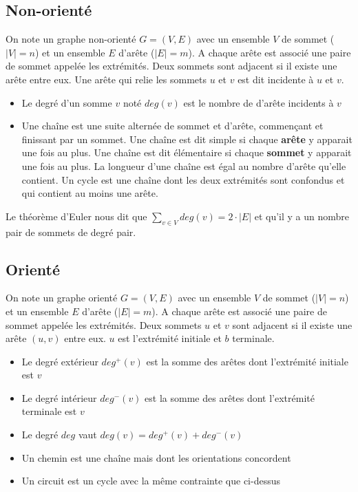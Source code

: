 \documentclass[11pt,a4paper]{report}
\begin{document}
\subsection{Non-orienté}
On note un graphe non-orienté $G=(V,E)$ avec un ensemble $V$ de sommet ($|V|=n$) et un ensemble $E$ d'arête ($|E|=m$). A chaque arête est associé une paire de sommet appelée les extrémités. Deux sommets sont adjacent si il existe une arête entre eux. Une arête qui relie les sommets $u$ et $v$ est dit incidente à $u$ et $v$.

\begin{itemize}
    \item Le degré d'un somme $v$ noté $deg(v)$ est le nombre de d'arête incidents à $v$
    \item Une chaîne est une suite alternée de sommet et d'arête, commençant et finissant par un sommet. Une chaîne est dit simple si chaque \textbf{arête} y apparait une fois au plus. Une chaîne est dit élémentaire si chaque \textbf{sommet} y apparait une fois au plus. La longueur d'une chaîne est égal au nombre d'arête qu'elle contient. Un cycle est une chaîne dont les deux extrémités sont confondus et qui contient au moins une arête.
\end{itemize}

Le théorème d'Euler nous dit que $\sum_{v\in V} deg(v) = 2\cdot |E|$ et qu'il y a un nombre pair de sommets de degré pair.

\subsection{Orienté}
On note un graphe orienté $G=(V,E)$ avec un ensemble $V$ de sommet ($|V|=n$) et un ensemble $E$ d'arête ($|E|=m$). A chaque arête est associé une paire de sommet appelée les extrémités. Deux sommets $u$ et $v$ sont adjacent si il existe une arête $(u,v)$ entre eux. $u$ est l'extrémité initiale et $b$ terminale.

\begin{itemize}
    \item Le degré extérieur $deg^+(v)$ est la somme des arêtes dont l'extrémité initiale est $v$
    \item Le degré intérieur $deg^-(v)$ est la somme des arêtes dont l'extrémité terminale est $v$
    \item Le degré $deg$ vaut $deg(v)=deg^+(v)+deg^-(v)$
    \item Un chemin est une chaîne mais dont les orientations concordent
    \item Un circuit est un cycle avec la même contrainte que ci-dessus
\end{itemize}
\end{document}
